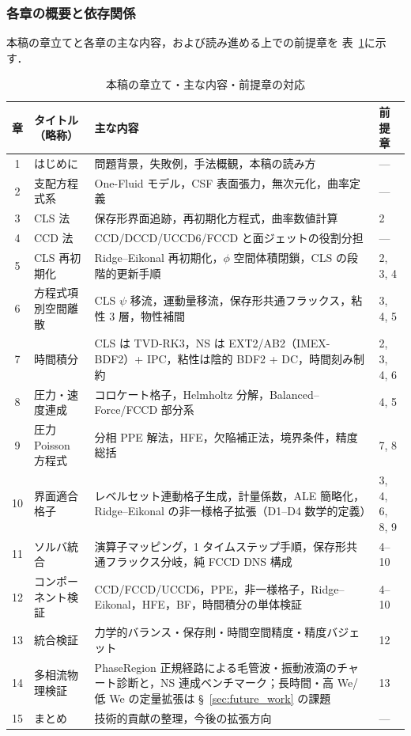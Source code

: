 \subsubsection{各章の概要と依存関係}

本稿の章立てと各章の主な内容，および読み進める上での前提章を
表~\ref{tab:chapter_overview}に示す．

\begin{table}[htbp]
\centering
\caption{本稿の章立て・主な内容・前提章の対応}
\label{tab:chapter_overview}
\renewcommand{\arraystretch}{\PaperTableArrayStretch}
\begin{tabular}{clp{68mm}l}
\toprule
章 & タイトル（略称） & 主な内容 & 前提章 \\
\midrule
1  & はじめに
   & 問題背景，失敗例，手法概観，本稿の読み方
   & --- \\
2  & 支配方程式系
   & One-Fluid モデル，CSF 表面張力，無次元化，曲率定義
   & --- \\
3  & CLS 法
   & 保存形界面追跡，再初期化方程式，曲率数値計算
   & 2 \\
4  & CCD 法
   & CCD/DCCD/UCCD6/FCCD と面ジェットの役割分担
   & --- \\
5  & CLS 再初期化
   & Ridge--Eikonal 再初期化，$\phi$ 空間体積閉鎖，CLS の段階的更新手順
   & 2, 3, 4 \\
6  & 方程式項別空間離散
   & CLS $\psi$ 移流，運動量移流，保存形共通フラックス，粘性 3 層，物性補間
   & 3, 4, 5 \\
7  & 時間積分
   & CLS は TVD-RK3，NS は EXT2/AB2（IMEX-BDF2）+ IPC，粘性は陰的 BDF2 + DC，時間刻み制約
   & 2, 3, 4, 6 \\
8  & 圧力・速度連成
   & コロケート格子，Helmholtz 分解，Balanced--Force/FCCD 部分系
   & 4, 5 \\
9  & 圧力 Poisson 方程式
   & 分相 PPE 解法，HFE，欠陥補正法，境界条件，精度総括
   & 7, 8 \\
10 & 界面適合格子
   & レベルセット連動格子生成，計量係数，ALE 簡略化，Ridge--Eikonal の非一様格子拡張（D1--D4 数学的定義）
   & 3, 4, 6, 8, 9 \\
11 & ソルバ統合
   & 演算子マッピング，1 タイムステップ手順，保存形共通フラックス分岐，純 FCCD DNS 構成
   & 4--10 \\
12 & コンポーネント検証
   & CCD/FCCD/UCCD6，PPE，非一様格子，Ridge--Eikonal，HFE，BF，時間積分の単体検証
   & 4--10 \\
13 & 統合検証
   & 力学的バランス・保存則・時間空間精度・精度バジェット
   & 12 \\
14 & 多相流物理検証
   & PhaseRegion 正規経路による毛管波・振動液滴のチャート診断と，NS 連成ベンチマーク；長時間・高 We/低 We の定量拡張は §~\ref{sec:future_work} の課題
   & 13 \\
15 & まとめ
   & 技術的貢献の整理，今後の拡張方向
   & --- \\
\bottomrule
\end{tabular}
\end{table}

